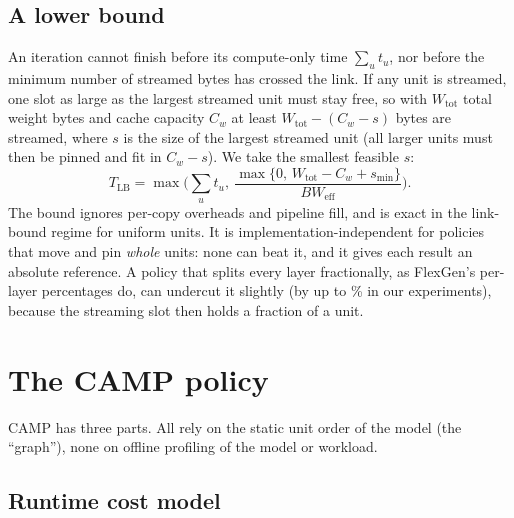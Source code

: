 \documentclass[preprint,12pt]{elsarticle}
\newcommand{\camp}{\textsc{CAMP}}
\newcommand{\bwlink}{BW_{\mathrm{eff}}}
\begin{document}
\subsection{A lower bound}
\label{sec:method-lb}

An iteration cannot finish before its compute-only time $\sum_u t_u$, nor before the minimum number of streamed bytes has crossed the link. If any unit is streamed, one slot as large as the largest streamed unit must stay free, so with $W_{\mathrm{tot}}$ total weight bytes and cache capacity $C_w$ at least $W_{\mathrm{tot}}-(C_w-s)$ bytes are streamed, where $s$ is the size of the largest streamed unit (all larger units must then be pinned and fit in $C_w-s$). We take the smallest feasible $s$:
\begin{equation}
T_{\mathrm{LB}} = \max\Big(\sum_u t_u,\ \frac{\max\{0,\,W_{\mathrm{tot}}-C_w+s_{\min}\}}{\bwlink}\Big).
\label{eq:lb}
\end{equation}
The bound ignores per-copy overheads and pipeline fill, and is exact in the link-bound regime for uniform units. It is implementation-independent for policies that move and pin \emph{whole} units: none can beat it, and it gives each result an absolute reference. A policy that splits every layer fractionally, as FlexGen's per-layer percentages do, can undercut it slightly (by up to \nFgBelowLbMax\% in our experiments), because the streaming slot then holds a fraction of a unit.

\section{The CAMP policy}
\label{sec:camp}

\camp{} has three parts. All rely on the static unit order of the model (the ``graph''), none on offline profiling of the model or workload.

\subsection{Runtime cost model}
\label{sec:costmodel}
\end{document}
